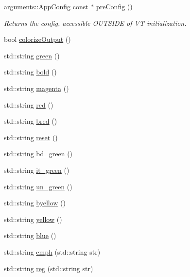 \begin{DoxyCompactItemize}
\item 
\hyperlink{structvt_1_1arguments_1_1_app_config}{arguments\+::\+App\+Config} const  $\ast$ \hyperlink{namespacevt_1_1debug_a852027d87cfb65bb21dd8ce1e8c23c61}{pre\+Config} ()
\begin{DoxyCompactList}\small\item\em Returns the config, accessible O\+U\+T\+S\+I\+DE of VT initialization. \end{DoxyCompactList}\item 
bool \hyperlink{namespacevt_1_1debug_adf5702c2e0469340d30ee8882848f304}{colorize\+Output} ()
\item 
std\+::string \hyperlink{namespacevt_1_1debug_ac88d2f3171c5f622861b5c8ea986f281}{green} ()
\item 
std\+::string \hyperlink{namespacevt_1_1debug_a7a1e7bc4a250917d20840a4d48e27388}{bold} ()
\item 
std\+::string \hyperlink{namespacevt_1_1debug_a1617ac1c602fb27518f6ab8fd4bf99c1}{magenta} ()
\item 
std\+::string \hyperlink{namespacevt_1_1debug_a6b162f2ca1d964d7cf05c4079d5554a0}{red} ()
\item 
std\+::string \hyperlink{namespacevt_1_1debug_ae03a761958b929eaa82f356059f71a46}{bred} ()
\item 
std\+::string \hyperlink{namespacevt_1_1debug_a4456c051bd468fe024334f24887867af}{reset} ()
\item 
std\+::string \hyperlink{namespacevt_1_1debug_a26f95b8d5da98fa54a335789b18fb3d3}{bd\+\_\+green} ()
\item 
std\+::string \hyperlink{namespacevt_1_1debug_a749c31dee324cac600ec442f9f39eb7c}{it\+\_\+green} ()
\item 
std\+::string \hyperlink{namespacevt_1_1debug_aa449a2c29c030d8cd267fd19c0511d5c}{un\+\_\+green} ()
\item 
std\+::string \hyperlink{namespacevt_1_1debug_afb3aac4faf63d7f2aac0d6d142d0b599}{byellow} ()
\item 
std\+::string \hyperlink{namespacevt_1_1debug_ad85c9e5ee0f986151a01212647d2b60d}{yellow} ()
\item 
std\+::string \hyperlink{namespacevt_1_1debug_a26b73aa7586b78f4c148b26e5414ebe1}{blue} ()
\item 
std\+::string \hyperlink{namespacevt_1_1debug_add365336d7aa2053b5b7588ccad48ac7}{emph} (std\+::string str)
\item 
std\+::string \hyperlink{namespacevt_1_1debug_a394711b7d26f45a51bf46c86032742f1}{reg} (std\+::string str)

\end{DoxyCompactItemize}
